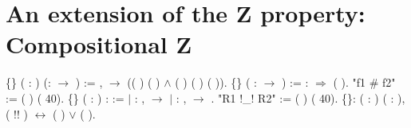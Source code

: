 \section{An extension of the Z property: Compositional Z}


\begin{coqdoccode}
\coqdocemptyline
\coqdocnoindent
{}  \{\} ( :  ) (:  \ensuremath{\rightarrow} ) := \coqdockw{\ensuremath{\forall}}  ,    \ensuremath{\rightarrow} (( )  ( ) \ensuremath{\land} ( ) ( ) ( )).\coqdoceol
\coqdocemptyline
\coqdocnoindent
{}  \{\} ( :  \ensuremath{\rightarrow} ) :=  : \ensuremath{\Rightarrow}  ( ).\coqdoceol
\coqdocnoindent
{} "f1 \# f2" := (  ) (  40).\coqdoceol
\coqdocemptyline
\coqdocnoindent
{}  \{\} ( :  ) :   :=\coqdoceol
\coqdocnoindent
\ensuremath{|} : \coqdockw{\ensuremath{\forall}}  ,    \ensuremath{\rightarrow}     \coqdoceol
\coqdocnoindent
\ensuremath{|} : \coqdockw{\ensuremath{\forall}}  ,    \ensuremath{\rightarrow}     .\coqdoceol
\coqdocnoindent
{} "R1 !\_! R2" := (  ) (  40).\coqdoceol
\coqdocemptyline
\coqdocnoindent
{}  \{\}: \coqdockw{\ensuremath{\forall}} ( :  ) ( : ), ( !\coqdocvar{\_}! )   \ensuremath{\leftrightarrow} (  ) \ensuremath{\lor} (  ).\coqdoceol

\end{coqdoccode}
